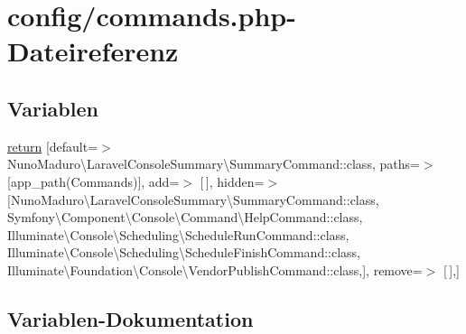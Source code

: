 \hypertarget{commands_8php}{}\section{config/commands.php-\/\+Dateireferenz}
\label{commands_8php}
\subsection*{Variablen}
\begin{DoxyCompactItemize}
\item 
\hyperlink{commands_8php_a291a507f4fefdf1fac4fd2a828520e9b}{return} \mbox{[}\textquotesingle{}default\textquotesingle{}=$>$ Nuno\+Maduro\textbackslash{}\+Laravel\+Console\+Summary\textbackslash{}\+Summary\+Command\+::class, \textquotesingle{}paths\textquotesingle{}=$>$ \mbox{[}app\+\_\+path(\textquotesingle{}Commands\textquotesingle{})\mbox{]}, \textquotesingle{}add\textquotesingle{}=$>$ \mbox{[}$\,$\mbox{]}, \textquotesingle{}hidden\textquotesingle{}=$>$ \mbox{[}Nuno\+Maduro\textbackslash{}\+Laravel\+Console\+Summary\textbackslash{}\+Summary\+Command\+::class, Symfony\textbackslash{}\+Component\textbackslash{}\+Console\textbackslash{}\+Command\textbackslash{}\+Help\+Command\+::class, Illuminate\textbackslash{}\+Console\textbackslash{}\+Scheduling\textbackslash{}\+Schedule\+Run\+Command\+::class, Illuminate\textbackslash{}\+Console\textbackslash{}\+Scheduling\textbackslash{}\+Schedule\+Finish\+Command\+::class, Illuminate\textbackslash{}\+Foundation\textbackslash{}\+Console\textbackslash{}\+Vendor\+Publish\+Command\+::class,\mbox{]}, \textquotesingle{}remove\textquotesingle{}=$>$ \mbox{[}$\,$\mbox{]},\mbox{]}
\end{DoxyCompactItemize}


\subsection{Variablen-\/\+Dokumentation}
\mbox{\label{commands_8php_a291a507f4fefdf1fac4fd2a828520e9b}} 
